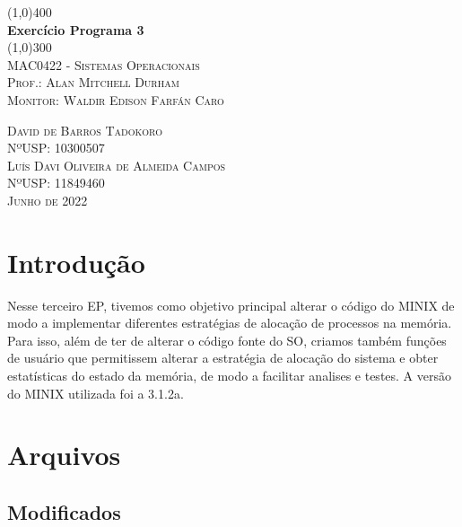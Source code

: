 \documentclass[a4paper, 12pt]{article}
\begin{document}
\begin{titlepage}
	\begin{center}
		\line(1,0){400} \\
		[0.25in]
		\huge{\bfseries Exercício Programa 3} \\
		[0.01in]
		\line(1,0){300} \\
		[0.5cm]
		\textsc{\Large MAC0422 - Sistemas Operacionais} \\
		[1.5cm]
		\textsc{\large Prof.: Alan Mitchell Durham}\\
		\textsc{\large Monitor: Waldir Edison Farfán Caro}\\
		[12cm]
	\end{center}
	\begin{flushright}
		\textsc{David de Barros Tadokoro}\\
		\textsc{NºUSP: 10300507}\\
		\textsc{Luís Davi Oliveira de Almeida Campos}\\
		\textsc{NºUSP: 11849460}\\
		\textsc{Junho de 2022}
	\end{flushright}
\end{titlepage}

\newpage

\section{Introdução}

Nesse terceiro EP, tivemos como objetivo principal alterar o código do MINIX de modo a implementar diferentes estratégias de alocação de processos na memória. Para isso, além de ter de alterar o código fonte do SO, criamos também funções de usuário que permitissem alterar a estratégia de alocação do sistema e obter estatísticas do estado da memória, de modo a facilitar analises e testes. A versão do MINIX utilizada foi a 3.1.2a.


\section{Arquivos}

\subsection{Modificados}
\end{document}
